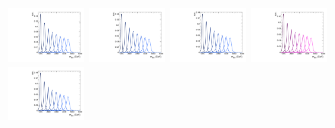\begin{figure}[htbp]
  \centering
  \includegraphics[width=0.18\textwidth]{fig/2Dfit/templateSignalVsMX_fromDC_VBFGbuToWW_MVV_mu_HP_nobb_LDy.pdf}
  \includegraphics[width=0.18\textwidth]{fig/2Dfit/templateSignalVsMX_fromDC_VBFRadToWW_MVV_mu_HP_nobb_LDy.pdf}
  \includegraphics[width=0.18\textwidth]{fig/2Dfit/templateSignalVsMX_fromDC_VBFZprToWW_MVV_mu_HP_nobb_LDy.pdf}
  \includegraphics[width=0.18\textwidth]{fig/2Dfit/templateSignalVsMX_fromDC_VBFWprToWZ_MVV_mu_HP_nobb_LDy.pdf}\\
  \includegraphics[width=0.18\textwidth]{fig/2Dfit/templateSignalVsMX_fromDC_VBFGbuToWW_MVV_mu_LP_nobb_LDy.pdf}

\end{figure}
